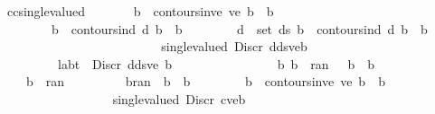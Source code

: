 %
\begin{isabellebody}%
\def\isabellecontext{ExCFSV}%
\isamarkuptrue%
\isamarkupfalse%
\ cc{\isacharunderscore}single{\isacharunderscore}valued{\isacharprime}{\isacharcolon}\isanewline
\ \ \ \ \ \ {\isachardoublequoteopen}{\isasymlbrakk}\ {\isasymforall}b{\isacharprime}\ {\isasymin}\ contours{\isacharunderscore}in{\isacharunderscore}ve\ ve{\isachardot}\ b{\isacharprime}\ {\isacharless}\ b\isanewline
\ \ \ \ \ \ \ {\isacharsemicolon}\ {\isasymforall}b{\isacharprime}\ {\isasymin}\ contours{\isacharunderscore}in{\isacharunderscore}d\ d{\isachardot}\ b{\isacharprime}\ {\isacharless}\ b\isanewline
\ \ \ \ \ \ \ {\isacharsemicolon}\ {\isasymforall}d{\isacharprime}\ {\isasymin}\ set\ ds{\isachardot}\ {\isasymforall}b{\isacharprime}\ {\isasymin}\ contours{\isacharunderscore}in{\isacharunderscore}d\ d{\isacharprime}{\isachardot}\ b{\isacharprime}\ {\isacharless}\ b\isanewline
\ \ \ \ \ \ \ {\isasymrbrakk}\isanewline
\ \ \ \ \ \ \ {\isasymLongrightarrow}\isanewline
\ \ \ \ \ \ \ {\isacharparenleft}\ \ \ single{\isacharunderscore}valued\ {\isacharparenleft}{\isasymF}{\isasymcdot}{\isacharparenleft}Discr\ {\isacharparenleft}d{\isacharcomma}ds{\isacharcomma}ve{\isacharcomma}b{\isacharparenright}{\isacharparenright}{\isacharparenright}\isanewline
\ \ \ \ \ \ \ {\isasymand}\ {\isacharparenleft}{\isasymforall}\ {\isacharparenleft}{\isacharparenleft}lab{\isacharcomma}{\isasymbeta}{\isacharparenright}{\isacharcomma}t{\isacharparenright}\ {\isasymin}\ {\isasymF}{\isasymcdot}{\isacharparenleft}Discr\ {\isacharparenleft}d{\isacharcomma}ds{\isacharcomma}ve{\isacharcomma}\ b{\isacharparenright}{\isacharparenright}{\isachardot}\isanewline
\ \ \ \ \ \ \ \ \ \ \ \ \ \ \ {\isasymexists}\ b{\isacharprime}{\isachardot}\ b{\isacharprime}\ {\isasymin}\ ran\ {\isasymbeta}\ {\isasymand}\ b\ {\isasymle}\ b{\isacharprime}{\isacharparenright}\isanewline
\ \ \ \ \ \ \ {\isacharparenright}{\isachardoublequoteclose}\isanewline
\ \ \ {\isachardoublequoteopen}{\isasymlbrakk}\ b\ {\isasymin}\ ran\ {\isasymbeta}{\isacharprime}\isanewline
\ \ \ \ \ \ \ {\isacharsemicolon}\ {\isasymforall}b{\isacharprime}{\isasymin}ran\ {\isasymbeta}{\isacharprime}{\isachardot}\ b{\isacharprime}\ {\isasymle}\ b\isanewline
\ \ \ \ \ \ \ {\isacharsemicolon}\ {\isasymforall}b{\isacharprime}\ {\isasymin}\ contours{\isacharunderscore}in{\isacharunderscore}ve\ ve{\isachardot}\ b{\isacharprime}\ {\isasymle}\ b\isanewline
\ \ \ \ \ \ \ {\isasymrbrakk}\isanewline
\ \ \ \ \ \ \ {\isasymLongrightarrow}\isanewline
\ \ \ \ \ \ \ {\isacharparenleft}\ \ \ single{\isacharunderscore}valued\ {\isacharparenleft}{\isasymC}{\isasymcdot}{\isacharparenleft}Discr\ {\isacharparenleft}c{\isacharcomma}{\isasymbeta}{\isacharprime}{\isacharcomma}ve{\isacharcomma}b{\isacharparenright}{\isacharparenright}{\isacharparenright}\isanewline

\end{isabellebody}
